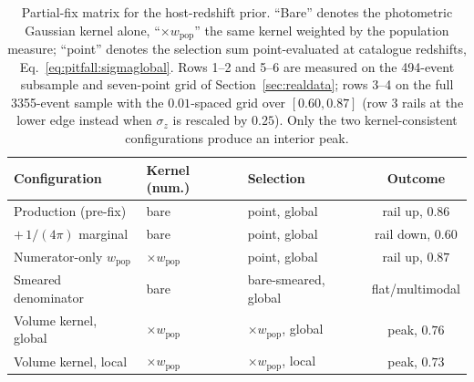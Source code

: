 \begin{table}
\centering
\caption{Partial-fix matrix for the host-redshift prior. ``Bare'' denotes the photometric Gaussian kernel alone, ``$\times w_{\mathrm{pop}}$'' the same kernel weighted by the population measure; ``point'' denotes the selection sum point-evaluated at catalogue redshifts, Eq.~\eqref{eq:pitfall:sigmaglobal}. Rows 1--2 and 5--6 are measured on the 494-event subsample and seven-point grid of Section~\ref{sec:realdata}; rows 3--4 on the full 3355-event sample with the $0.01$-spaced grid over $[0.60, 0.87]$ (row 3 rails at the lower edge instead when $\sigma_z$ is rescaled by $0.25$). Only the two kernel-consistent configurations produce an interior peak.}
\label{tab:partialfix}
\begin{tabular}{lllc}
\hline
Configuration & Kernel (num.) & Selection & Outcome \\
\hline
Production (pre-fix) & bare & point, global & rail up, $0.86$ \\ %
$+\,1/(4\pi)$ marginal & bare & point, global & rail down, $0.60$ \\ %
Numerator-only $w_{\mathrm{pop}}$ & $\times w_{\mathrm{pop}}$ & point, global & rail up, $0.87$ \\ %
Smeared denominator & bare & bare-smeared, global & flat/multimodal \\ %
Volume kernel, global & $\times w_{\mathrm{pop}}$ & $\times w_{\mathrm{pop}}$, global & peak, $0.76$ \\ %
Volume kernel, local & $\times w_{\mathrm{pop}}$ & $\times w_{\mathrm{pop}}$, local & peak, $0.73$ \\ %
\hline
\end{tabular}
\end{table}


